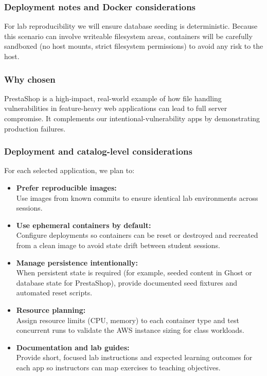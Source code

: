 \documentclass[12pt]{article}
\begin{document}
\subsubsection*{Deployment notes and Docker considerations}
For lab reproducibility we will ensure database seeding is deterministic. Because this scenario can involve writeable filesystem areas, containers will be carefully sandboxed (no host mounts, strict filesystem permissions) to avoid any risk to the host.

\subsubsection*{Why chosen}
PrestaShop is a high-impact, real-world example of how file handling vulnerabilities in feature-heavy web applications can lead to full server compromise. It complements our intentional-vulnerability apps by demonstrating production failures.

\subsubsection{Deployment and catalog-level considerations}
For each selected application, we plan to:
\begin{itemize}
    \item \textbf{Prefer reproducible images:}\\ Use images from known commits to ensure identical lab environments across sessions.
    \item \textbf{Use ephemeral containers by default:}\\ Configure deployments so containers can be reset or destroyed and recreated from a clean image to avoid state drift between student sessions.
    \item \textbf{Manage persistence intentionally:}\\ When persistent state is required (for example, seeded content in Ghost or database state for PrestaShop), provide documented seed fixtures and automated reset scripts.
    \item \textbf{Resource planning:}\\ Assign resource limits (CPU, memory) to each container type and test concurrent runs to validate the AWS instance sizing for class workloads.
    \item \textbf{Documentation and lab guides:}\\ Provide short, focused lab instructions and expected learning outcomes for each app so instructors can map exercises to teaching objectives.
\end{itemize}
\end{document}
